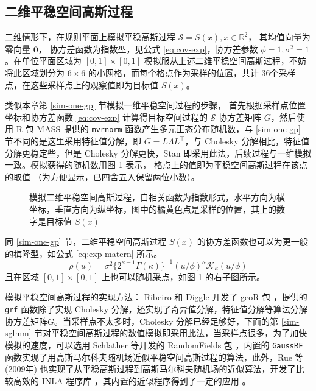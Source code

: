 \documentclass[12pt,a4paper,UTF8,twoside]{book}
\theoremstyle{definition}
\theoremstyle{definition}
\theoremstyle{definition}
\theoremstyle{remark}
\begin{document}
\hypertarget{sim-two-gp}{%
\subsection{二维平稳空间高斯过程}\label{sim-two-gp}}

二维情形下，在规则平面上模拟平稳高斯过程
\(\mathcal{S} = S(x), x \in \mathbb{R}^2\)， 其均值向量为零向量
\(\mathbf{0}\)， 协方差函数为指数型，见公式 \eqref{eq:cov-exp}，协方差参数
\(\phi = 1, \sigma^2 = 1\)。在单位平面区域为 \([0,1] \times [0,1]\)
模拟服从上述二维平稳空间高斯过程，不妨将此区域划分为 \(6 \times 6\)
的小网格，而每个格点作为采样的位置，共计
36个采样点，在这些采样点上的观察值即为目标值 \(S(x)\)。

类似本章第 \ref{sim-one-gp} 节模拟一维平稳空间过程的步骤，
首先根据采样点位置坐标和协方差函数 \eqref{eq:cov-exp} 计算得目标空间过程的
\(\mathcal{S}\) 协方差矩阵 \(G\)，然后使用 R 包 MASS 提供的
\texttt{mvrnorm} 函数产生多元正态分布随机数，与 \ref{sim-one-gp}
节不同的是这里采用特征值分解，即 \(G = L\Lambda L^{\top}\)，与 Cholesky
分解相比，特征值分解更稳定些，但是 Cholesky 分解更快，Stan
即采用此法，后续过程与一维模拟一致。模拟获得的随机数用图
\ref{fig:sim-two-gp} 表示， 格点上的值即为平稳空间高斯过程在该点的取值
（为方便显示，已四舍五入保留两位小数）。

\begin{figure}

{\centering {}

}

\caption{模拟二维平稳空间高斯过程，自相关函数为指数形式，水平方向为横坐标，垂直方向为纵坐标，图中的橘黄色点是采样的位置，其上的数字是目标值 $S(x)$}\label{fig:sim-two-gp}
\end{figure}

同 \ref{sim-one-gp} 节，二维平稳空间高斯过程 \(S(x)\)
的协方差函数也可以为更一般的梅隆型，如公式 \eqref{eq:exp-matern} 所示。
\begin{equation}
\rho(u) = \sigma^2 \{ 2^{\kappa -1} \Gamma(\kappa) \}^{-1}( u/\phi )^{\kappa} \mathcal{K}_{\kappa}( u / \phi ) \label{eq:exp-matern}
\end{equation} \noindent 且在区域 \([0,1] \times [0,1]\)
上也可以随机采点，如图 \ref{fig:sim-two-gp} 的右子图所示。

模拟平稳空间高斯过程的实现方法： Ribeiro 和 Diggle 开发了 geoR 包
\citep{geoR2001}，提供的 \texttt{grf} 函数除了实现 Cholesky
分解，还实现了奇异值分解，特征值分解等算法分解协方差矩阵\(G\)。当采样点不太多时，Cholesky
分解已经足够好，下面的第 \ref{sim-sglmm}
节对平稳空间高斯过程的数值模拟即采用此法，当采样点很多，为了加快模拟的速度，可以选用
Schlather 等开发的 RandomFields 包 \citep{RandomFields2015}，内置的
\texttt{GaussRF}
函数实现了用高斯马尔科夫随机场近似平稳空间高斯过程的算法，此外，Rue 等
(2009年) \citep{Rue2009}
也实现了从平稳高斯过程到高斯马尔科夫随机场的近似算法，开发了比较高效的
INLA 程序库 \citep{INLA2015}，其内置的近似程序得到了一定的应用
\citep{Blangiardo2015, Faraway2018}。
\end{document}
